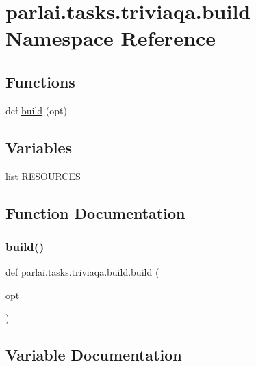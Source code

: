 \hypertarget{namespaceparlai_1_1tasks_1_1triviaqa_1_1build}{}\section{parlai.\+tasks.\+triviaqa.\+build Namespace Reference}
\label{namespaceparlai_1_1tasks_1_1triviaqa_1_1build}
\subsection*{Functions}
\begin{DoxyCompactItemize}
\item 
def \hyperlink{namespaceparlai_1_1tasks_1_1triviaqa_1_1build_a2e4e4e43e9c7bdb10a786035307d2227}{build} (opt)
\end{DoxyCompactItemize}
\subsection*{Variables}
\begin{DoxyCompactItemize}
\item 
list \hyperlink{namespaceparlai_1_1tasks_1_1triviaqa_1_1build_a58fae2da74b916d31216b868157cc5e4}{R\+E\+S\+O\+U\+R\+C\+ES}
\end{DoxyCompactItemize}


\subsection{Function Documentation}
\mbox{\label{namespaceparlai_1_1tasks_1_1triviaqa_1_1build_a2e4e4e43e9c7bdb10a786035307d2227}} 
\subsubsection{\texorpdfstring{build()}{build()}}
{\footnotesize\ttfamily def parlai.\+tasks.\+triviaqa.\+build.\+build (\begin{DoxyParamCaption}\item[{}]{opt }\end{DoxyParamCaption})}



\subsection{Variable Documentation}
\mbox{\label{namespaceparlai_1_1tasks_1_1triviaqa_1_1build_a58fae2da74b916d31216b868157cc5e4}} 
